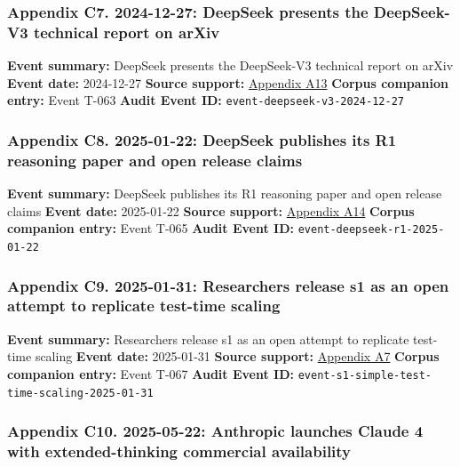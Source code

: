 \documentclass[
  american,
  11pt,
  letterpaper,
]{article}
\begin{document}
\subsubsection{Appendix C7. 2024-12-27: DeepSeek presents the
DeepSeek-V3 technical report on
arXiv}\label{appendix-c7-2024-12-27-deepseek-presents-the-deepseek-v3-technical-report-on-arxiv}

\textbf{Event summary:} DeepSeek presents the DeepSeek-V3 technical
report on arXiv \textbf{Event date:} 2024-12-27 \textbf{Source support:}
\hyperref[appendix-a13-deepseek-v3-technical-report]{Appendix A13}
\textbf{Corpus companion entry:} Event T-063 \textbf{Audit Event ID:}
\texttt{event-deepseek-v3-2024-12-27}

\subsubsection{Appendix C8. 2025-01-22: DeepSeek publishes its R1
reasoning paper and open release
claims}\label{appendix-c8-2025-01-22-deepseek-publishes-its-r1-reasoning-paper-and-open-release-claims}

\textbf{Event summary:} DeepSeek publishes its R1 reasoning paper and
open release claims \textbf{Event date:} 2025-01-22 \textbf{Source
support:}
\hyperref[appendix-a14-deepseek-r1-incentivizing-reasoning-capability-in-llms-via-reinforcement-learning]{Appendix
A14} \textbf{Corpus companion entry:} Event T-065 \textbf{Audit Event
ID:} \texttt{event-deepseek-r1-2025-01-22}

\subsubsection{Appendix C9. 2025-01-31: Researchers release s1 as an
open attempt to replicate test-time
scaling}\label{appendix-c9-2025-01-31-researchers-release-s1-as-an-open-attempt-to-replicate-test-time-scaling}

\textbf{Event summary:} Researchers release s1 as an open attempt to
replicate test-time scaling \textbf{Event date:} 2025-01-31
\textbf{Source support:}
\hyperref[appendix-a7-s1-simple-test-time-scaling]{Appendix A7}
\textbf{Corpus companion entry:} Event T-067 \textbf{Audit Event ID:}
\texttt{event-s1-simple-test-time-scaling-2025-01-31}

\subsubsection{Appendix C10. 2025-05-22: Anthropic launches Claude 4
with extended-thinking commercial
availability}\label{appendix-c10-2025-05-22-anthropic-launches-claude-4-with-extended-thinking-commercial-availability}
\end{document}
